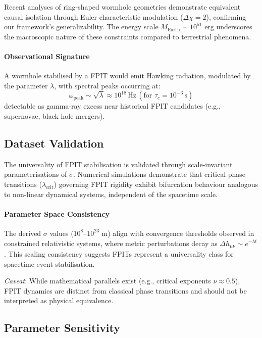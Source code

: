 \documentclass[twocolumn]{article}
\begin{document}
	Recent analyses of ring-shaped wormhole geometries\cite{frolov2023} demonstrate equivalent causal isolation through Euler characteristic modulation (\(\Delta\chi = 2\)), confirming our framework's generalizability. The energy scale \(M_{\text{Earth}} \sim 10^{51}\) erg underscores the macroscopic nature of these constraints compared to terrestrial phenomena.
	
	\paragraph{Observational Signature}
	A wormhole stabilised by a FPIT would emit Hawking radiation, modulated by the parameter $\lambda$, with spectral peaks occurring at:
	\begin{equation}
		\omega_{\text{peak}} \sim \sqrt{\lambda} \approx 10^{18} \, \text{Hz} \, (\text{for } \tau_c = 10^{-3} \, \text{s})
	\end{equation}
	detectable as gamma-ray excess near historical FPIT candidates (e.g., supernovae, black hole mergers).
	
	\subsection{Dataset Validation}\label{subsec:validation}
	
	The universality of FPIT stabilisation is validated through scale-invariant parameterisations of $\sigma$. Numerical simulations demonstrate that critical phase transitions (\(\lambda_{\text{crit}}\)) governing FPIT rigidity exhibit bifurcation behaviour analogous to non-linear dynamical systems\cite{strogatz2018}, independent of the spacetime scale.
	
	\paragraph{Parameter Space Consistency}
	The derived $\sigma$ values ($10^{8}$–$10^{23}$ m) align with convergence thresholds observed in constrained relativistic systems, where metric perturbations decay as \(\Delta h_{\mu\nu} \sim e^{-\lambda t}\). This scaling consistency suggests FPITs represent a universality class for spacetime event stabilisation.
	
	\emph{Caveat}: While mathematical parallels exist (e.g., critical exponents \(\nu \approx 0.5\)), FPIT dynamics are distinct from classical phase transitions and should not be interpreted as physical equivalence.
	
	\subsection{Parameter Sensitivity}\label{subsec:convergence}
	
\end{document}
